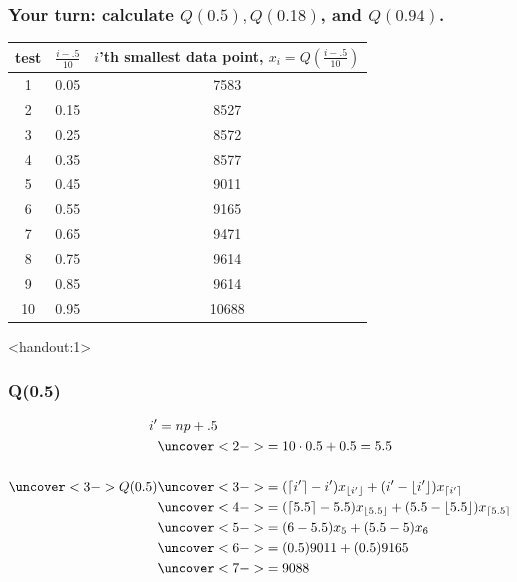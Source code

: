 \documentclass[handout]{beamer}
\newcommand{\answers}{1}
\numberwithin{equation}{section}
\begin{document}
\begin{frame}
\frametitle{\small Your turn: calculate $Q(0.5), Q(0.18)$, and $Q(0.94)$.} \small

\begin{table}[ht]
\centering
\begin{tabular}{ccc}
 test & $\frac{i - .5}{10}$ & $i$'th smallest data point, $x_i = Q(\frac{i - .5}{10})$ \\ 
  \hline
  1 & 0.05 & 7583 \\ 
    2 & 0.15 & 8527 \\ 
    3 & 0.25 & 8572 \\ 
    4 & 0.35 & 8577 \\ 
    5 & 0.45 & 9011 \\ 
    6 & 0.55 & 9165 \\ 
    7 & 0.65 & 9471 \\ 
    8 & 0.75 & 9614 \\ 
    9 & 0.85 & 9614 \\ 
   10 & 0.95 & 10688 \\ 
  \end{tabular}
\end{table}
\end{frame}

\begin{frame}<handout:\answers>
\frametitle{Q(0.5)}
\begin{align*}
i' &= np + .5 \\
& \uncover<2->{=10 \cdot 0.5 + 0.5 = 5.5}\\ \\
\uncover<3->{Q(0.5)} &   \uncover<3->{=(\lceil i' \rceil -i')x_{\lfloor i' \rfloor} + (i'-\lfloor i' \rfloor)x_{\lceil i' \rceil}} \\
&\uncover<4->{= (\lceil 5.5 \rceil - 5.5)x_{\lfloor 5.5 \rfloor} + (5.5 - \lfloor 5.5 \rfloor)x_{\lceil 5.5 \rceil}} \\
&\uncover<5->{= (6 - 5.5) x_5 + (5.5 - 5) x_6} \\
&\uncover<6->{= (0.5) 9011 + (0.5) 9165} \\
&\uncover<7->{= 9088}
\end{align*}
\end{frame}
\end{document}
